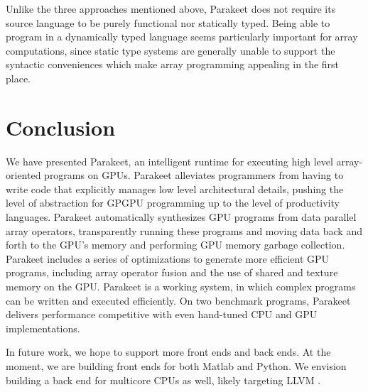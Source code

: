 \documentclass[preprint]{sigplanconf}
\begin{document}
Unlike the three approaches mentioned above, Parakeet does not require its source language to be purely functional nor statically typed. Being able to program in a dynamically typed language seems particularly important for array computations, since static type systems are generally unable to support the syntactic conveniences which make array programming appealing in the first place. 

\section{Conclusion}
\label{Conclusion}

We have presented Parakeet, an intelligent runtime for executing high level
array-oriented programs on GPUs.  Parakeet alleviates programmers from having
to write code that explicitly manages low level architectural details, pushing
the level of abstraction for GPGPU programming up to the level of productivity
languages.  Parakeet automatically synthesizes GPU programs from data parallel
array operators, transparently running these programs and moving data back and
forth to the GPU's memory and performing GPU memory garbage collection.
Parakeet includes a series of optimizations to generate more efficient GPU
programs, including array operator fusion and the use of shared and texture
memory on the GPU.  Parakeet is a working system, in which complex programs can
be written and executed efficiently.  On two benchmark programs, Parakeet
delivers performance competitive with even hand-tuned CPU and GPU
implementations.

In future work, we hope to support more front ends and back ends.  At the
moment, we are building front ends for both Matlab and Python.  We envision
building a back end for multicore CPUs as well, likely targeting LLVM
\cite{Latt02}.


{}
\end{document}
